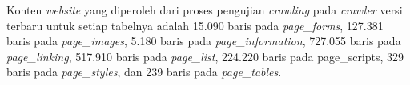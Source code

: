 \begin{enumerate}
	Konten \textit{website} yang diperoleh dari proses pengujian \textit{crawling} pada \textit{crawler} versi terbaru untuk setiap tabelnya adalah 15.090 baris pada \textit{page\_forms}, 127.381 baris pada \textit{page\_images}, 5.180 baris pada \textit{page\_information}, 727.055 baris pada \textit{page\_linking}, 517.910 baris pada \textit{page\_list}, 224.220 baris pada page\_scripts, 329 baris pada \textit{page\_styles}, dan 239 baris pada \textit{page\_tables}.

\end{enumerate}



